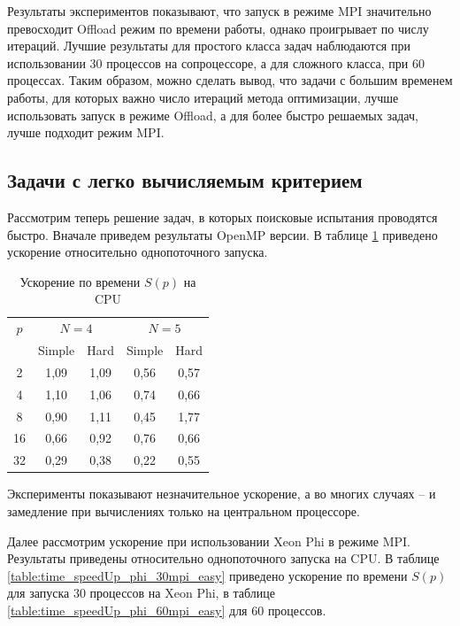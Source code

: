 \par
Результаты экспериментов показывают, что запуск в режиме MPI значительно превосходит Offload режим по времени работы, однако проигрывает по числу итераций. Лучшие результаты для простого класса задач наблюдаются при использовании 30 процессов на сопроцессоре, а для сложного класса, при 60 процессах. Таким образом, можно сделать вывод, что задачи с большим временем работы, для которых важно число итераций метода оптимизации, лучше использовать запуск в режиме Offload, а для более быстро решаемых задач, лучше подходит режим MPI. 
\subsection{Задачи с легко вычисляемым критерием}
Рассмотрим теперь решение задач, в которых поисковые испытания проводятся быстро. Вначале приведем результаты OpenMP версии. В таблице \ref{table:time_speedUp_cpu_2} приведено ускорение относительно однопоточного запуска.
\begin{table}
    \centering
    \begin{tabular}{|c|c|c|c|c|}
    \hline
    \(p\) & \multicolumn{2}{|c|}{\(N=4\)} & \multicolumn{2}{|c|}{\(N=5\)}\\ \cline{2-5}
    & Simple & Hard & Simple & Hard \\ \hline
	2 & 1,09 & 1,09 & 0,56 & 0,57 \\ \hline
	4 & 1,10 & 1,06 & 0,74 & 0,66 \\ \hline
	8 & 0,90 & 1,11 & 0,45 & 1,77 \\ \hline
	16 & 0,66 & 0,92 & 0,76 & 0,66 \\ \hline
	32 & 0,29 & 0,38 & 0,22 & 0,55 \\ \hline
    \end{tabular}
    \caption{Ускорение по времени \(S(p)\) на CPU}
    \label{table:time_speedUp_cpu_2}
\end{table}
\par
Эксперименты показывают незначительное ускорение, а во многих случаях – и замедление при вычислениях только на центральном процессоре.
\par
Далее рассмотрим ускорение при использовании Xeon Phi в режиме MPI. Результаты приведены относительно однопоточного запуска на CPU. В таблице \ref{table:time_speedUp_phi_30mpi_easy} приведено ускорение по времени \(S(p)\) для запуска 30 процессов на Xeon Phi, в таблице \ref{table:time_speedUp_phi_60mpi_easy} для 60 процессов.
